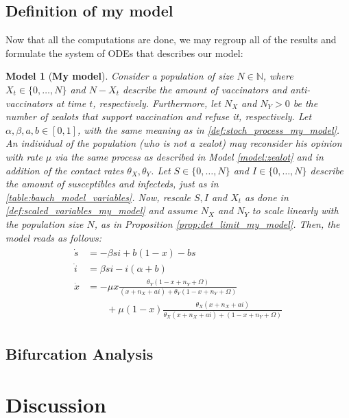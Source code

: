 \documentclass[12pt,a4paper,twoside]{article}
\newtheorem{model}{Model}[section]
\begin{document}
\subsection{Definition of my model}
Now that all the computations are done, we may regroup all of the results and formulate the system of \acp{ODE} that describes our model:
\begin{model}[\textbf{My model}]\label{model:my_model}
Consider a population of size $N \in \mathbb{N}$, where $X_t \in \lbrace 0,\dots,N\rbrace$ and $N-X_t$ describe the amount of vaccinators and anti-vaccinators at time $t$, respectively. Furthermore, let $N_X$ and $N_Y > 0$ be the number of zealots that support vaccination and refuse it, respectively. Let $\alpha,\beta,a,b \in \left[0,1\right]$, with the same meaning as in \eqref{def:stoch_process_my_model}. An individual of the population (who is not a zealot) may reconsider his opinion with rate $\mu$ via the same process as described in Model \ref{model:zealot} and in addition of the contact rates $\theta_X, \theta_Y$. Let $S \in \lbrace 0,\dots,N\rbrace$ and $I \in  \lbrace 0,\dots,N\rbrace$ describe the amount of susceptibles and infecteds, just as in \eqref{table:bauch_model_variables}. Now, rescale $S,I$ and $X_t$ as done in \eqref{def:scaled_variables_my_model} and assume $N_X$ and $N_Y$ to scale linearly with the population size $N$, as in Proposition \ref{prop:det_limit_my_model}. Then, the model reads as follows:
	\begin{align}
	\begin{split}
	\dot{s} &= -\beta si + b\left(1-x\right) - bs\\
	\dot{i} &= \beta si - i\left(\alpha + b\right)\\
	\dot{x} &= -\mu x\frac{\theta_Y(1-x+n_Y+\Omega)}{(x+n_X+ai) + \theta_Y(1-x+n_Y+\Omega)}\\
	&\qquad+ \mu \left(1-x\right)\frac{\theta_X (x+ n_X+ ai)}{\theta_X (x + n_X + ai) + (1-x + n_Y + \Omega)}
	\end{split}
	\end{align}
\end{model}
\subsection{Bifurcation Analysis}
\section{Discussion}


\newpage
\printbibliography
\end{document}
